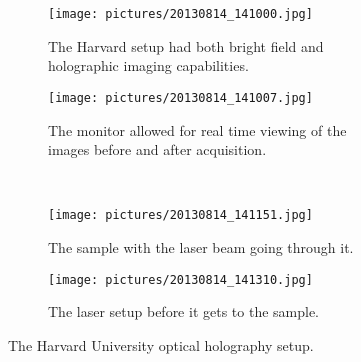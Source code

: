 \begin{figure}[ht!]
    \begin{center}

        \begin{subfigure}[t]{0.4\textwidth}
            \label{fig:second}
            \texttt{[image: pictures/20130814\_141000.jpg]}
            \caption{The Harvard setup had both bright field and holographic
            imaging capabilities.}
        \end{subfigure}
                \hspace*{\fill}
        \begin{subfigure}[t]{0.4\textwidth}
            \label{fig:third}
            \texttt{[image: pictures/20130814\_141007.jpg]}
            \caption{The monitor allowed for real time viewing of the images
            before and after acquisition.}
        \end{subfigure}
        \\

        \begin{subfigure}[t]{0.4\textwidth}
            \label{fig:fourth}
            \texttt{[image: pictures/20130814\_141151.jpg]}
            \caption{The sample with the laser beam going through it.}
        \end{subfigure}
        \hspace*{\fill}
        \begin{subfigure}[t]{0.4\textwidth}%
            \label{fig:fifth}
            \texttt{[image: pictures/20130814\_141310.jpg]}
            \caption{The laser setup before it gets to the sample.}
        \end{subfigure}

    \end{center}
    \caption{%
        The Harvard University optical holography setup.
    }%
    \label{fig:harvardSetup}
\end{figure}


